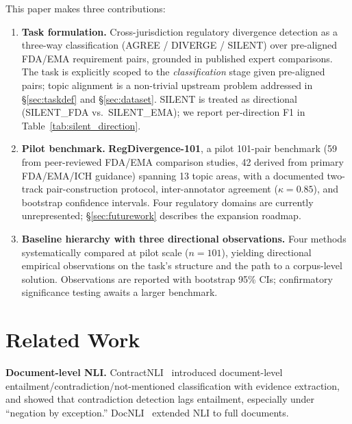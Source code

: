 \documentclass[manuscript]{acmart}
\begin{document}
\begin{revblock}
This paper makes three contributions:
\begin{enumerate}
\item \textbf{Task formulation.} Cross-jurisdiction regulatory divergence
  detection as a three-way classification (AGREE / DIVERGE / SILENT) over
  pre-aligned FDA/EMA requirement pairs, grounded in published expert
  comparisons. The task is explicitly scoped to the \textit{classification}
  stage given pre-aligned pairs; topic alignment is a non-trivial upstream
  problem addressed in \S\ref{sec:taskdef} and \S\ref{sec:dataset}. SILENT
  is treated as directional (SILENT\_FDA vs.\ SILENT\_EMA); we report
  per-direction F1 in Table~\ref{tab:silent_direction}.
\item \textbf{Pilot benchmark.} \textbf{RegDivergence-101}, a pilot 101-pair
  benchmark (59 from peer-reviewed FDA/EMA comparison studies, 42 derived from
  primary FDA/EMA/ICH guidance) spanning 13 topic areas, with a documented
  two-track pair-construction protocol, inter-annotator agreement
  ($\kappa = 0.85$), and bootstrap confidence intervals. Four regulatory
  domains are currently unrepresented; \S\ref{sec:futurework} describes the
  expansion roadmap.
\item \textbf{Baseline hierarchy with three directional observations.} Four
  methods systematically compared at pilot scale ($n = 101$), yielding
  directional empirical observations on the task's structure and the path to a
  corpus-level solution. Observations are reported with bootstrap 95\% CIs;
  confirmatory significance testing awaits a larger benchmark.
\end{enumerate}
\end{revblock}

\section{Related Work}

\textbf{Document-level NLI.} ContractNLI~\cite{koreeda2021contractnli} introduced
document-level entailment/contradiction/not-mentioned classification with
evidence extraction, and showed that contradiction detection lags entailment,
especially under ``negation by exception.'' DocNLI~\cite{yin2021docnli} extended
NLI to full documents.
\end{document}
